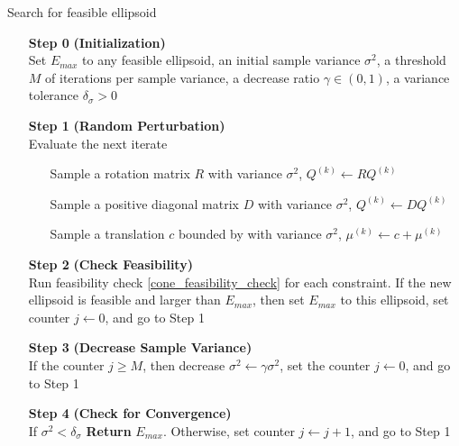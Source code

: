 \documentclass{article}
\theoremstyle{case}
\newcommand{\qk}{{Q^{(k)}}}
\newcommand{\centerk}{{\mu^{(k)}}}
\begin{document}
\begin{algorithm}[H]
    \caption{Search for feasible ellipsoid}
    \label{constrained_dfo}
    \begin{itemize}
        \item[\textbf{Step 0}] \textbf{(Initialization)} \\
                Set $E_{max}$ to any feasible ellipsoid, 
                an initial sample variance $\sigma^2$, 
                a threshold $M$ of iterations per sample variance, 
                a decrease ratio $\gamma \in (0, 1)$, 
                a variance tolerance $\delta_{\sigma} > 0$
        
        \item[\textbf{Step 1}] \textbf{(Random Perturbation)} \\
            Evaluate the next iterate \begin{itemize}
                \item[] Sample a rotation matrix $R$ with variance $\sigma^2$, $\qk \gets R \qk$
                \item[] Sample a positive diagonal matrix $D$ with variance $\sigma^2$, $\qk \gets D \qk$
                \item[] Sample a translation $c$ bounded by with variance $\sigma^2$, $\centerk \gets c + \centerk$
            \end{itemize}
        
        \item[\textbf{Step 2}] \textbf{(Check Feasibility)} \\
            Run feasibility check \cref{cone_feasibility_check} for each constraint.
            If the new ellipsoid is feasible and larger than $E_{max}$, then 
            	set $E_{max}$ to this ellipsoid,
            	set counter $j \gets 0$, and
            	go to Step 1
        
        \item[\textbf{Step 3}] \textbf{(Decrease Sample Variance)} \\
            If the counter $j \ge M$, then
	    	decrease $\sigma^2 \gets \gamma \sigma^2$,
	    	set the counter $j\gets 0$, and
	    	go to Step 1
            
        \item[\textbf{Step 4}] \textbf{(Check for Convergence)} \\
	    If $\sigma^2 < \delta_{\sigma}$ \textbf{Return} $E_{max}$.
	    Otherwise, 
        		set counter $j \gets j + 1$, and
        		go to Step 1
    \end{itemize}
\end{algorithm}
\end{document}
